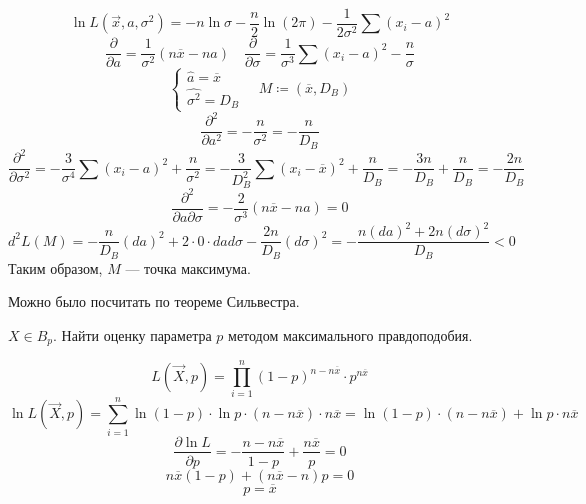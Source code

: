 

\cfoot{}



\[\ln L (\vec{x}, a, \sigma^2) = - n \ln \sigma - \frac{n}{2} \ln (2\pi) - \frac{1}{2\sigma^2} \sum (x_i - a)^2\]
\[\frac{\partial}{\partial a} = \frac{1}{\sigma^2} (n \overline{x} - na) \quad \frac{\partial}{\partial \sigma} = \frac{1}{\sigma^3} \sum (x_i - a)^2 - \frac{n}{\sigma}\]
\[\begin{cases}
        \hat{a} = \overline{x} \\
        \hat{\sigma^2} = D_B
    \end{cases} \quad M \coloneqq (\overline{x}, D_B)\]
\[\frac{\partial^2}{\partial a^2} = -\frac{n}{\sigma^2} = - \frac{n}{D_B}\]
\[\frac{\partial^2}{\partial \sigma^2} = - \frac{3}{\sigma^4} \sum (x_i - a)^2 + \frac{n}{\sigma^2} = - \frac{3}{D_B^2} \sum (x_i - \overline{x})^2 + \frac{n}{D_B} = - \frac{3n}{D_B} + \frac{n}{D_B} = - \frac{2n}{D_B}\]
\[\frac{\partial^2}{\partial a \partial \sigma} = - \frac{2}{\sigma^3} (n \overline{x} - na) = 0\]
\[d^2 L(M) = - \frac{n}{D_B} (da)^2 + 2 \cdot 0 \cdot dad\sigma - \frac{2n}{D_B} (d\sigma)^2 = -\frac{n (da)^2 + 2n (d\sigma)^2}{D_B} < 0\]
Таким образом, \(M\) --- точка максимума.

\begin{remark}
    Можно было посчитать по теореме Сильвестра.
\end{remark}

\begin{exercise}
    \(X \in B_p\). Найти оценку параметра \(p\) методом максимального правдоподобия.
\end{exercise}

\begin{solution}
    \[L(\vec{X}, p) = \prod_{i=1}^{n} (1 - p)^{n - n \overline{x}} \cdot p^{n \overline{x}}\]
    \[\ln L(\vec{X}, p) = \sum_{i=1}^{n} \ln(1 - p) \cdot \ln p \cdot (n - n \overline{x}) \cdot n \overline{x} = \ln(1 - p) \cdot (n - n \overline{x}) + \ln p \cdot n \overline{x}\]
    \[\frac{\partial \ln L}{\partial p} = - \frac{n - n \overline{x}}{1 - p} + \frac{n \overline{x}}{p} = 0\]
    \[n \overline{x} (1 - p) + (n \overline{x} - n)p = 0\]
    \[p = \overline{x}\]
\end{solution}

